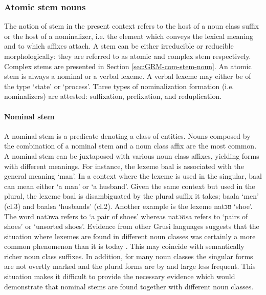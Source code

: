 \begin{exe}
\begin{exe}
\begin{exe}
{\begin{exe}
\begin{exe}
\begin{exe}
\begin{exe}
\subsubsection{Atomic stem nouns}
\label{sec:GRM-sim-bas-noun}

The notion of stem in the present context refers to the host of a noun class
suffix or the  host of a nominalizer, i.e. the element which conveys the lexical
meaning and  to which affixes attach. A stem can be either irreducible or
reducible morphologically: they are referred to as atomic  and complex stem
respectively.  Complex stems are presented in  Section
\ref{sec:GRM-com-stem-noun}.   An atomic stem is always a  nominal or a verbal
lexeme.  A verbal lexeme may either be of the type `state' or `process'. Three
types of nominalization formation (i.e. nominalizers) are attested: suffixation,
prefixation, and reduplication.  


\paragraph{Nominal  stem}
\label{sec:GRM-nom-stem}
A nominal stem is a predicate denoting a class of entities.   Nouns composed by
the combination of  a nominal stem and a noun class affix are the most common. A
nominal stem can be juxtaposed with various noun class affixes, yielding forms
with
different meanings. For instance, the lexeme {\sls baal} is associated with the
general meaning `man'. In a context where the lexeme is used in the singular,
{\sls baal} can mean either `a man' or `a husband'. Given the same context but
used in the plural, the lexeme {\sls baal} is disambiguated by the 
plural suffix it takes;  {\sls baala} `men'  ({\sc cl.3}) and  {\sls baalsa}
`husbands'  ({\sc cl.2}). Another
example is the lexeme {\sls natɔʊ} `shoe'. The word {\sls natɔwa} refers to `a 
pair
of shoes' whereas {\sls natɔʊsa} refers to `pairs of shoes' or `unsorted shoes'.
Evidence from other Grusi languages suggests that the situation where lexemes
are found in different noun classes was certainly a   more common
phenomenon than it is today \citep[126--128]{Bonv88}. This may coincide
with semantically richer
noun class suffixes. In addition, for many noun classes the singular forms are
not overtly marked and the plural forms are by and large less frequent. This
situation makes it difficult to provide the necessary evidence which would
demonstrate that nominal stems are found together with different noun classes.  


\end{exe}
\end{exe}
\end{exe}
\end{exe}}
\end{exe}
\end{exe}
\end{exe}
